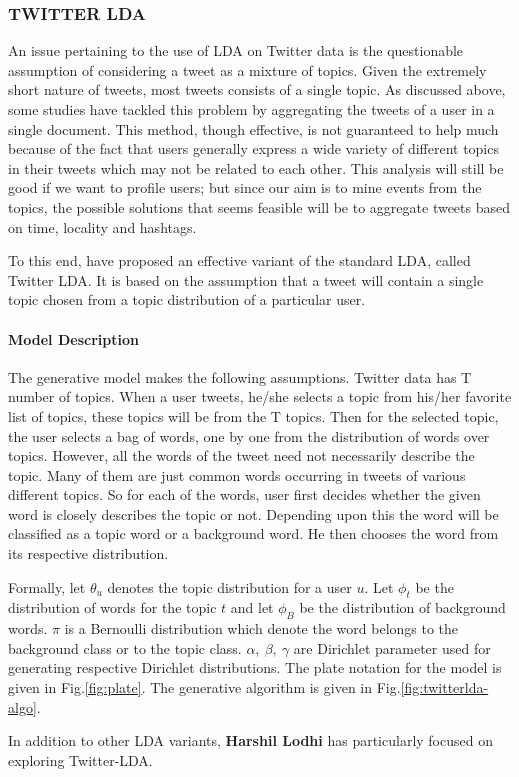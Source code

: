 
\subsubsection{\uppercase{Twitter LDA}}
An issue pertaining to the use of LDA on Twitter data is the questionable assumption of considering a tweet as a mixture of topics. Given the extremely short nature of tweets, most tweets consists of a single topic. As discussed above, some studies have tackled this problem by aggregating the tweets of a user in a single document. This method, though effective, is not guaranteed to help much because of the fact that users generally express a wide variety of different topics in their tweets which may not be related to each other. This analysis will still be good if we want to profile users; but since our aim is to mine events from the topics, the possible solutions that seems feasible will be to aggregate tweets based on time, locality and hashtags.

To this end, \cite{zhao2011comparing} have proposed an effective variant of the standard LDA, called Twitter LDA. It is based on the assumption that a tweet will contain a single topic chosen from a topic distribution of a particular user. 

\paragraph{Model Description} 
The generative model makes the following assumptions. Twitter data has T number of topics. When a user tweets, he/she selects a topic from his/her favorite list of topics, these topics will be from the T topics. Then for the selected topic, the user selects a bag of words, one by one from the distribution of words over topics. However, all the words of the tweet need not necessarily describe the topic. Many of them are just common words occurring in tweets of various different topics. So for each of the words, user first decides whether the given word is closely describes the topic or not. Depending upon this the word will be classified as a topic word or a background word. He then chooses the word from its respective distribution.

Formally, let $\theta_u$ denotes the topic distribution for a user $u$. Let $\phi_t$ be the distribution of words for the topic $t$ and let $\phi_B$ be the distribution of background words. $\pi$ is a Bernoulli distribution which denote the word belongs to the background class or to the topic class. $\alpha,~\beta,~\gamma$ are Dirichlet parameter used for generating respective Dirichlet distributions. The plate notation for the model is given in Fig.\ref{fig:plate}. The generative algorithm is given in Fig.\ref{fig:twitterlda-algo}.

In addition to other LDA variants, {\bf Harshil Lodhi} has particularly focused on exploring Twitter-LDA.

